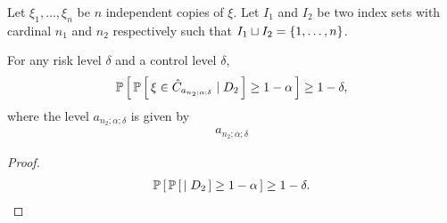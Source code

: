 \documentclass[11pt]{article}
\begin{document}
\begin{proposition}
Let $\xi_1, \ldots, \xi_n$ be $n$ independent copies of $\xi$.
Let $I_1$ and $I_2$ be two index sets with cardinal $n_1$ and $n_2$ respectively such that
$I_1 \sqcup I_2 = \left\{ 1, \ldots, n \right\}$.

For any risk level $\delta$ and a control level $\delta$,
\begin{align*}
    \mathbb{P}
    \left[\, 
        \mathbb{P}
        \left[\, 
            \xi \in \hat{C}_{a_{n_2; \alpha; \delta}} \mid D_2
         \,\right] \geq 1 - \alpha
     \,\right] \geq 1 - \delta,
\end{align*}
where the level $a_{n_2; \alpha; \delta}$ is given by
\begin{align*}
    a_{n_2; \alpha; \delta}
\end{align*}

\end{proposition}
\begin{proof}
\begin{align*}
    \mathbb{P}
    \left[\, 
        \mathbb{P}
        \left[\, 
            \mid D_2
         \,\right] \geq 1 - \alpha
     \,\right] \geq 1 - \delta. 
\end{align*}
\end{proof}
\end{document}
